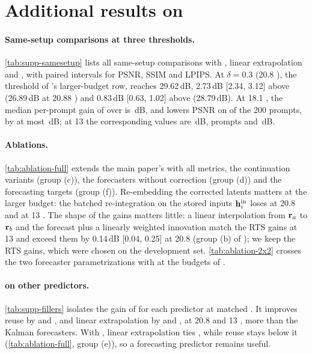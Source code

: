 \section{Additional results on \flux}
\label{supp:results}



\paragraph{Same-setup comparisons at three thresholds.}
\cref{tab:supp-samesetup} lists all same-setup comparisons with \seacache, linear extrapolation and \kalsea, with paired
intervals for PSNR, SSIM and LPIPS. At $\delta=0.3$ (20.8 \nfe), the threshold of \seacache's larger-budget row, \ours
reaches 29.62\,dB, 2.73\,dB [2.34, 3.12] above \seacache (26.89\,dB at 20.88 \nfe) and 0.83\,dB
[0.63, 1.02] above \kalsea (28.79\,dB). At 18.1 \nfe, the median per-prompt gain of \pcgs over \kalsea is
\suppPcgsMedianA\,dB, and \pcgs lowers PSNR on \suppPcgsNegA{} of the 200 prompts, by at most \suppPcgsWorstA\,dB; at 13
\nfe the corresponding values are \suppPcgsMedianB\,dB, \suppPcgsNegB{} prompts and \suppPcgsWorstB\,dB.

\paragraph{Ablations.}
\cref{tab:ablation-full} extends the main paper's  with all metrics, the continuation variants
(group (c)), the forecasters without correction (group (d)) and the forecasting targets (group (f)). Re-embedding the
corrected latents matters at the larger budget: the batched re-integration on the stored inputs $\mathbf{h}^{\mathrm{in}}_i$ loses
\suppBatchedLossA{} at 20.8 \nfe and \suppBatchedLossB{} at 13 \nfe. The shape of the gains matters little: a linear
interpolation from $\mathbf{r}_a$ to $\mathbf{r}_b$ and the forecast plus a linearly weighted innovation match the RTS gains at
13 \nfe and exceed them by 0.14\,dB [0.04, 0.25] at 20.8 \nfe (group (b) of ); we keep the RTS
gains, which were chosen on the development set. \cref{tab:ablation-2x2} crosses the two forecaster parametrizations
with \pcgs at the budgets of .


\paragraph{\pcgs on other predictors.}
\cref{tab:supp-fillers} isolates the gain of \pcgs for each predictor at matched \nfe. It improves reuse by
\suppGainReuseA{} and \suppGainReuseB{}, and linear extrapolation by \suppGainLinextA{} and \suppGainLinextB{}, at 20.8
and 13 \nfe, more than the Kalman forecasters. With \pcgs, linear extrapolation ties \ours, while reuse
stays below it (\cref{tab:ablation-full}, group (e)), so a forecasting predictor remains useful.

